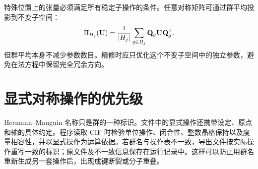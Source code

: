 特殊位置上的张量必须满足所有稳定子操作的条件。任意对称矩阵可通过群平均投影到不变子空间：
\begin{equation}
\Pi_{H_j}(\mathbf{U})=\frac{1}{|H_j|}\sum_{g\in H_j}\mathbf{Q}_g\mathbf{U}\mathbf{Q}_g^{\mathsf T}.
\label{eq:stabilizerU}
\end{equation}
但群平均本身不减少参数数目。精修时应只优化这个不变子空间中的独立参数，避免在法方程中保留完全冗余方向。

\section{显式对称操作的优先级}
Hermann--Mauguin 名称只是群的一种标识。文件中的显式操作还携带设定、原点和轴的具体约定。程序读取 CIF 时检验单位操作、闭合性、整数晶格保持以及度量相容性，并以显式操作为运算依据。若群名与操作表不一致，导出文件按实际操作重写一致的标识；原文件及不一致信息保存在运行记录中。这样可以防止用群名重新生成另一套操作后，出现成键断裂或分子重叠。
